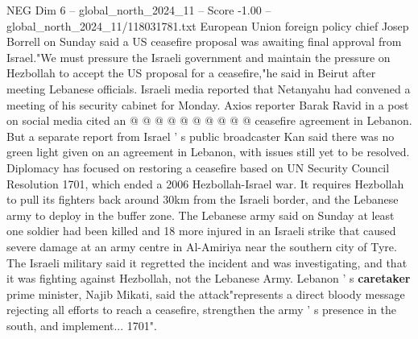 \begin{textsample}{NEG Dim 6 – global\_north\_2024\_11 – Score -1.00 – global\_north\_2024\_11/118031781.txt}
European Union foreign policy chief Josep Borrell on Sunday said a US ceasefire proposal was awaiting final approval from Israel."We must pressure the Israeli government and maintain the pressure on Hezbollah to accept the US proposal for a ceasefire,"he said in Beirut after meeting Lebanese officials.
Israeli media reported that Netanyahu had convened a meeting of his security cabinet for Monday.
Axios reporter Barak Ravid in a post on social media cited an @ @ @ @ @ @ @ @ @ @ ceasefire agreement in Lebanon.
But a separate report from Israel ' s public broadcaster Kan said there was no green light given on an agreement in Lebanon, with issues still yet to be resolved.
Diplomacy has focused on restoring a ceasefire based on UN Security Council Resolution 1701, which ended a 2006 Hezbollah-Israel war.
It requires Hezbollah to pull its fighters back around 30km from the Israeli border, and the Lebanese army to deploy in the buffer zone.
The Lebanese army said on Sunday at least one soldier had been killed and 18 more injured in an Israeli strike that caused severe damage at an army centre in Al-Amiriya near the southern city of Tyre.
The Israeli military said it regretted the incident and was investigating, and that it was fighting against Hezbollah, not the Lebanese Army.
Lebanon ' s \textbf{caretaker} prime minister, Najib Mikati, said the attack"represents a direct bloody message rejecting all efforts to reach a ceasefire, strengthen the army ' s presence in the south, and implement... 1701".

\end{textsample}
